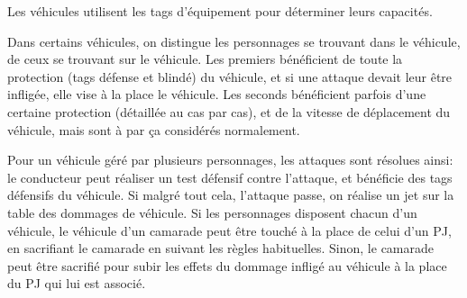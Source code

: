 \documentclass{report}
\begin{document}
\begin{multicols}{2}
Les véhicules utilisent les tags d'équipement pour déterminer leurs capacités.

Dans certains véhicules, on distingue les personnages se trouvant dans le véhicule, de ceux se trouvant sur le véhicule. Les premiers bénéficient de toute la protection (tags défense et blindé) du véhicule, et si une attaque devait leur être infligée, elle vise à la place le véhicule. Les seconds bénéficient parfois d'une certaine protection (détaillée au cas par cas), et de la vitesse de déplacement du véhicule, mais sont à par ça considérés normalement.

Pour un véhicule géré par plusieurs personnages, les attaques sont résolues ainsi: le conducteur peut réaliser un test défensif contre l'attaque, et bénéficie des tags défensifs du véhicule. Si malgré tout cela, l'attaque passe, on réalise un jet sur la table des dommages de véhicule. Si les personnages disposent chacun d'un véhicule, le véhicule d'un camarade peut être touché à la place de celui d'un PJ, en sacrifiant le camarade en suivant les règles habituelles. Sinon, le camarade peut être sacrifié pour subir les effets du dommage infligé au véhicule à la place du PJ qui lui est associé.


\end{multicols}
\end{document}
